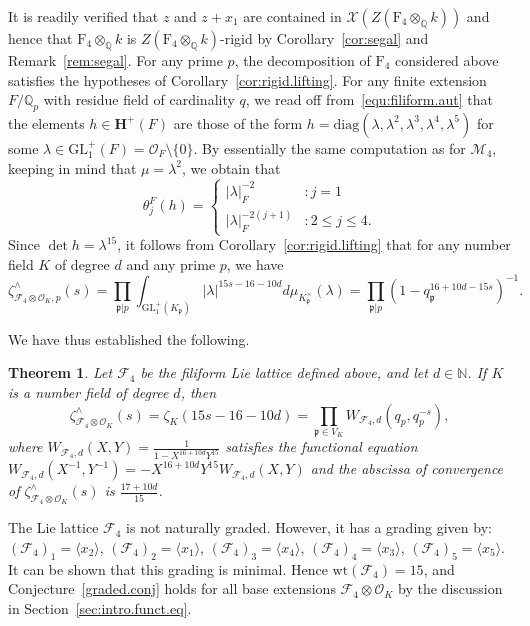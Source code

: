 \documentclass[11pt,a4paper]{amsart}
\theoremstyle{plain}
\newtheorem{thm}{Theorem}[section]
\theoremstyle{remark}
\newcommand{\N}{\mathbb{N}}
\newcommand{\Q}{\mathbb{Q}}
\newcommand{\tensor}{\otimes}
\newcommand{\p}{\mathfrak{p}}
\def \p {\ensuremath{\mathfrak{p}}}
\begin{document}
It is readily verified that $z$ and $z + x_1$ are contained in $\mathcal{X}(Z(\mathrm{F}_4 \tensor_\Q k))$ and hence that $\mathrm{F}_4 \tensor_\Q k$ is $Z(\mathrm{F}_4 \tensor_\Q k)$-rigid by Corollary~\ref{cor:segal} and Remark~\ref{rem:segal}.  For any prime $p$, the decomposition of $\mathrm{F}_4$ considered above satisfies the hypotheses of Corollary~\ref{cor:rigid.lifting}.  For any finite extension $F / \Q_p$ with residue field of cardinality $q$, we read off from~\eqref{equ:filiform.aut} that the elements $h \in \mathbf{H}^+(F)$ are those of the form $h = \mathrm{diag}(\lambda, \lambda^2, \lambda^3, \lambda^4, \lambda^5)$ for some $\lambda \in \mathrm{GL}_1^+(F) = \mathcal{O}_F \setminus \{ 0 \}$.  By essentially the same computation as for $\mathcal{M}_4$, keeping in mind that $\mu = \lambda^2$, we obtain that 
\begin{equation*}
\theta_j^F (h) = \begin{cases}
| \lambda |_F^{-2} &: j = 1 \\
| \lambda |_F^{-2(j+1)} &: 2 \leq j \leq 4.
\end{cases}
\end{equation*}
Since $\det h = \lambda^{15}$, it follows from Corollary~\ref{cor:rigid.lifting} that for any number field $K$ of degree $d$ and any prime $p$, we have
\begin{equation*}
\zeta^\wedge_{\mathcal{F}_4 \tensor \mathcal{O}_K, p}(s) = \prod_{\p | p} \int_{\mathrm{GL}_1^+(K_\p)} | \lambda |^{15s - 16 - 10d} d \mu_{K_\p^\times} (\lambda) = \prod_{\p | p} (1 - q_\p^{16 + 10d - 15s})^{-1}.
\end{equation*}

We have thus established the following.
\begin{thm} \label{thm:filiform}
Let $\mathcal{F}_4$ be the filiform Lie lattice defined above, and let $d \in \N$.  If $K$ is a number field of degree $d$, then
\begin{equation*}
\zeta^\wedge_{\mathcal{F}_4 \tensor \mathcal{O}_K}(s) = \zeta_K(15s - 16 - 10d) = \prod_{\p \in V_K} W_{\mathcal{F}_4, d}(q_p, q_p^{-s}),
\end{equation*}
where $W_{\mathcal{F}_4, d}(X,Y) = \frac{1}{1 - X^{16 + 10d}Y^{15}}$ satisfies the functional equation $W_{\mathcal{F}_4, d}(X^{-1}, Y^{-1}) = - X^{16 + 10d}Y^{15} W_{\mathcal{F}_4, d}(X,Y)$ and the abscissa of convergence of $\zeta^\wedge_{\mathcal{F}_4 \tensor \mathcal{O}_K}(s)$ is $\frac{17 + 10d}{15}$.
\end{thm}

The Lie lattice $\mathcal{F}_4$ is not naturally graded.  However, it has a grading given by: $(\mathcal{F}_4)_1 = \langle x_2 \rangle$, $(\mathcal{F}_4)_2 = \langle x_1 \rangle$, $(\mathcal{F}_4)_3 = \langle x_4 \rangle$, $(\mathcal{F}_4)_4 = \langle x_3 \rangle$, $(\mathcal{F}_4)_5 = \langle x_5 \rangle$.  It can be shown that this grading is minimal.  Hence $\mathrm{wt}(\mathcal{F}_4) = 15$, and Conjecture~\ref{graded.conj} holds for all base extensions $\mathcal{F}_4 \tensor \mathcal{O}_K$ by the discussion in Section~\ref{sec:intro.funct.eq}.
\end{document}
